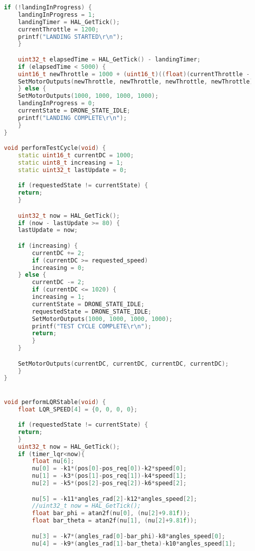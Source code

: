 \begin{lstlisting}[language=C++]
    if (!landingInProgress) {
    landingInProgress = 1;
    landingTimer = HAL_GetTick();
    currentThrottle = 1200;
    printf("LANDING STARTED\r\n");
    }

    uint32_t elapsedTime = HAL_GetTick() - landingTimer;
    if (elapsedTime < 5000) {
    uint16_t newThrottle = 1000 + (uint16_t)((float)(currentThrottle - 1000) * (1.0f - (float)elapsedTime / 5000.0f));
    SetMotorOutputs(newThrottle, newThrottle, newThrottle, newThrottle);
    } else {
    SetMotorOutputs(1000, 1000, 1000, 1000);
    landingInProgress = 0;
    currentState = DRONE_STATE_IDLE;
    printf("LANDING COMPLETE\r\n");
    }
}

void performTestCycle(void) {
    static uint16_t currentDC = 1000;
    static uint8_t increasing = 1;
    static uint32_t lastUpdate = 0;

    if (requestedState != currentState) {
    return;
    }

    uint32_t now = HAL_GetTick();
    if (now - lastUpdate >= 80) {
    lastUpdate = now;

    if (increasing) {
        currentDC += 2;
        if (currentDC >= requested_speed)
        increasing = 0;
    } else {
        currentDC -= 2;
        if (currentDC <= 1020) {
        increasing = 1;
        currentState = DRONE_STATE_IDLE;
        requestedState = DRONE_STATE_IDLE;
        SetMotorOutputs(1000, 1000, 1000, 1000);
        printf("TEST CYCLE COMPLETE\r\n");
        return;
        }
    }

    SetMotorOutputs(currentDC, currentDC, currentDC, currentDC);
    }
}


void performLQRStable(void) {
    float LQR_SPEED[4] = {0, 0, 0, 0};

    if (requestedState != currentState) {
    return;
    }
    uint32_t now = HAL_GetTick();
    if (timer_lqr<now){
        float nu[6];
        nu[0] = -k1*(pos[0]-pos_req[0])-k2*speed[0];
        nu[1] = -k3*(pos[1]-pos_req[1])-k4*speed[1];
        nu[2] = -k5*(pos[2]-pos_req[2])-k6*speed[2];

        nu[5] = -k11*angles_rad[2]-k12*angles_speed[2];
        //uint32_t now = HAL_GetTick();
        float bar_phi = atan2f(nu[0], (nu[2]+9.81f));
        float bar_theta = atan2f(nu[1], (nu[2]+9.81f));

        nu[3] = -k7*(angles_rad[0]-bar_phi)-k8*angles_speed[0];
        nu[4] = -k9*(angles_rad[1]-bar_theta)-k10*angles_speed[1];


\end{lstlisting}

